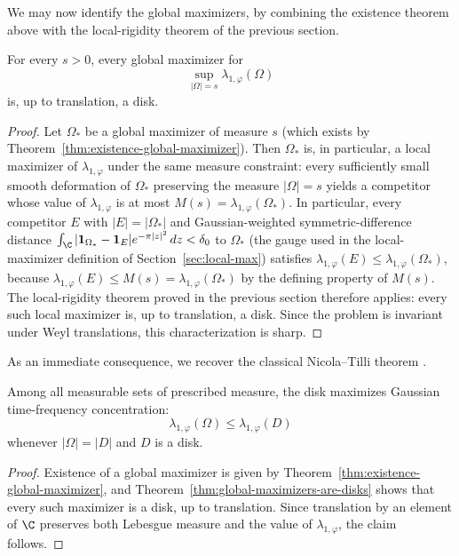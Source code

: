 We may now identify the global maximizers, by combining the existence theorem
above with the local-rigidity theorem of the previous section.

\begin{theorem}\label{thm:global-maximizers-are-disks}
For every \(s>0\), every global maximizer for
\[
\sup_{|\Omega|=s}\lambda_{1,\varphi}(\Omega)
\]
is, up to translation, a disk.
\end{theorem}

\begin{proof}
Let \(\Omega_*\) be a global maximizer of measure \(s\) (which exists by
Theorem~\ref{thm:existence-global-maximizer}). Then \(\Omega_*\) is, in
particular, a local maximizer of \(\lambda_{1,\varphi}\) under the same
measure constraint: every sufficiently small smooth deformation of
\(\Omega_*\) preserving the measure \(|\Omega|=s\) yields a competitor
whose value of \(\lambda_{1,\varphi}\) is at most
\(M(s)=\lambda_{1,\varphi}(\Omega_*)\). In particular, every competitor
\(E\) with \(|E|=|\Omega_*|\) and Gaussian-weighted symmetric-difference
distance \(\int_\C |\mathbf 1_{\Omega_*}-\mathbf 1_E|e^{-\pi|z|^2}\,dz<\delta_0\)
to \(\Omega_*\) (the gauge used in the local-maximizer definition of
Section~\ref{sec:local-max}) satisfies
\(\lambda_{1,\varphi}(E)\le \lambda_{1,\varphi}(\Omega_*)\), because
\(\lambda_{1,\varphi}(E)\le M(s)=\lambda_{1,\varphi}(\Omega_*)\) by the
defining property of \(M(s)\). The local-rigidity theorem proved in
the previous section therefore applies: every such local maximizer is, up
to translation, a disk. Since the problem is invariant under Weyl
translations, this characterization is sharp.
\end{proof}

As an immediate consequence, we recover the classical Nicola--Tilli theorem
\cite{Nicola-Tilli, Nicola-Tilli-2}.

\begin{corollary}
Among all measurable sets of prescribed measure, the disk maximizes Gaussian
time-frequency concentration:
\[
\lambda_{1,\varphi}(\Omega)\le \lambda_{1,\varphi}(D)
\]
whenever \(|\Omega|=|D|\) and \(D\) is a disk.
\end{corollary}

\begin{proof}
Existence of a global maximizer is given by
Theorem~\ref{thm:existence-global-maximizer}, and
Theorem~\ref{thm:global-maximizers-are-disks} shows that every such
maximizer is a disk, up to translation. Since translation by an element of
\(\C\) preserves both Lebesgue measure and the value of
\(\lambda_{1,\varphi}\), the claim follows.
\end{proof}


